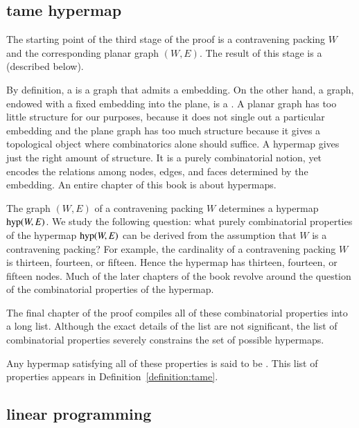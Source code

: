 \subsection{tame hypermap}

The starting point of the third stage of the proof is a contravening
packing $W$ and the corresponding planar graph $(W,E)$.  The result of
this stage is a  (described below).

By definition, a  is a graph that admits a
 embedding.  On the other hand, a graph, endowed with
a fixed embedding into the plane, is a .  A
planar graph has too little structure for our purposes, because it
does not single out a particular embedding and the plane graph has too
much structure because it gives a topological object where combinatorics
alone should suffice.  A hypermap gives just the right amount of
structure.  It is a purely combinatorial notion, yet encodes the
relations among nodes, edges, and faces determined by the embedding.
An entire chapter of this book is about hypermaps.

The graph $(W,E)$ of a contravening packing $W$ determines a hypermap
${\operatorname{hyp}}(W,E)$. We study the following question: what  purely
combinatorial properties of the hypermap ${\operatorname{hyp}}(W,E)$ can be derived from
the assumption  that
$W$ is a contravening packing?  For example, the cardinality of a
contravening packing $W$ is thirteen, fourteen, or fifteen.  Hence the hypermap
has thirteen, fourteen, or fifteen nodes.  Much of the later chapters of the book
revolve around the question of the combinatorial properties of the
hypermap.

The final chapter of the proof compiles all of these combinatorial
properties into a long list.  
Although the exact details of the list are not significant,
the list of combinatorial properties severely constrains the set of possible
hypermaps.  

Any hypermap satisfying all of these properties is said to be
.  This list of properties appears in
Definition~\ref{definition:tame}.


\subsection{linear programming}

